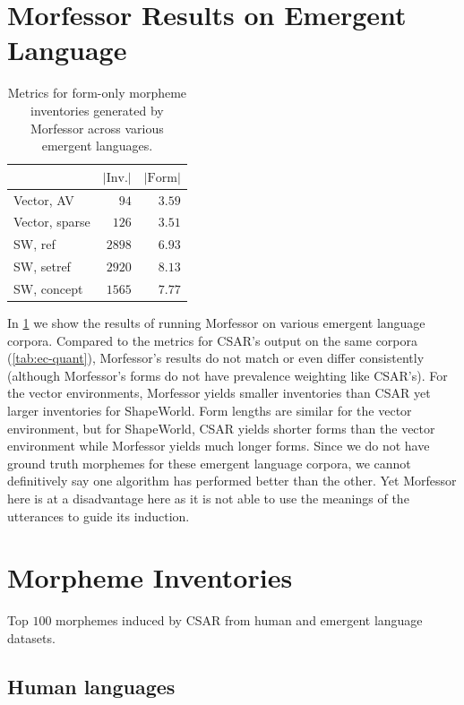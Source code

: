 \section{Morfessor Results on Emergent Language}
\unskip\label{sec:morf-ec}
\begin{table}
  \centering
  \begin{tabular}{lrr}
  \toprule
                 & $|\text{Inv.}|$ & $|\text{Form}|$ \\
  \midrule
  Vector, AV     &            $94$ & $3.59$ \\
  Vector, sparse &           $126$ & $3.51$ \\
  SW, ref        &          $2898$ & $6.93$ \\
  SW, setref     &          $2920$ & $8.13$ \\
  SW, concept    &          $1565$ & $7.77$ \\
  \bottomrule
  \end{tabular}
  \caption{Metrics for form-only morpheme inventories generated by Morfessor across various emergent languages.}
  \unskip\label{tab:morf-ec}
\end{table}

In \cref{tab:morf-ec} we show the results of running Morfessor on various emergent language corpora.
Compared to the metrics for CSAR's output on the same corpora (\cref{tab:ec-quant}), Morfessor's results do not match or even differ consistently (although Morfessor's forms do not have prevalence weighting like CSAR's).
For the vector environments, Morfessor yields smaller inventories than CSAR yet larger inventories for ShapeWorld.
Form lengths are similar for the vector environment, but for ShapeWorld, CSAR yields shorter forms than the vector environment while Morfessor yields much longer forms.
Since we do not have ground truth morphemes for these emergent language corpora, we cannot definitively say one algorithm has performed better than the other.
Yet Morfessor here is at a disadvantage here as it is not able to use the meanings of the utterances to guide its induction.

\section{Morpheme Inventories}
Top $100$ morphemes induced by CSAR from human and emergent language datasets.

\subsection{Human languages}%
\label{app:human-language}


